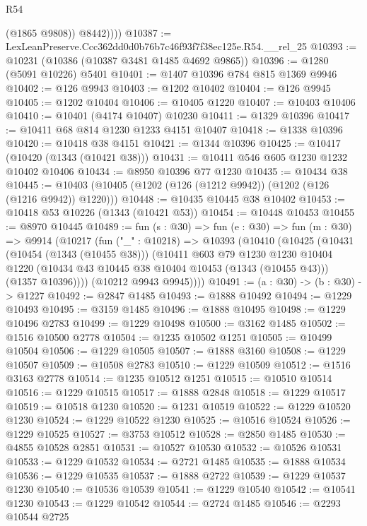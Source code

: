 \begin{lexlean}{R54}
\begin{coremodule}
              (@1865 @9808))
            @8442))))
@10387 := LexLeanPreserve.Ccc362dd0d0b76b7c46f93f7f38ec125e.R54.__rel_25
@10393 := @10231 (@10386 (@10387 @3481 @1485 @4692 @9865))
@10396 := @1280 (@5091 @10226) @5401
@10401 := @1407 @10396 @784 @815 @1369 @9946
@10402 := @126 @9943
@10403 := @1202 @10402
@10404 := @126 @9945
@10405 := @1202 @10404
@10406 := @10405 @1220
@10407 := @10403 @10406
@10410 := @10401 (@4174 @10407) @10230
@10411 := @1329 @10396
@10417 := @10411 @68 @814 @1230 @1233 @4151 @10407
@10418 := @1338 @10396
@10420 := @10418 @38 @4151
@10421 := @1344 @10396
@10425 := @10417 (@10420 (@1343 (@10421 @38)))
@10431 := @10411 @546 @605 @1230 @1232 @10402 @10406
@10434 := @8950 @10396 @77 @1230
@10435 := @10434 @38
@10445 := @10403 (@10405 (@1202 (@126 (@1212 @9942)) (@1202 (@126 (@1216 @9942)) @1220)))
@10448 := @10435 @10445 @38 @10402
@10453 := @10418 @53 @10226 (@1343 (@10421 @53))
@10454 := @10448 @10453
@10455 := @8970 @10445
@10489 := fun (s : @30) =>
  fun (e : @30) =>
  fun (m : @30) =>
  @9914
    (@10217
      (fun ("_" : @10218) =>
      @10393
        (@10410
          (@10425
            (@10431
              (@10454 (@1343 (@10455 @38)))
              (@10411
                @603
                @79
                @1230
                @1230
                @10404
                @1220
                (@10434 @43 @10445 @38 @10404 @10453 (@1343 (@10455 @43)))
                (@1357 @10396))))
          (@10212 @9943 @9945))))
@10491 := (a : @30) -> (b : @30) -> @1227
@10492 := @2847 @1485
@10493 := @1888 @10492
@10494 := @1229 @10493
@10495 := @3159 @1485
@10496 := @1888 @10495
@10498 := @1229 @10496 @2783
@10499 := @1229 @10498
@10500 := @3162 @1485
@10502 := @1516 @10500 @2778
@10504 := @1235 @10502 @1251
@10505 := @10499 @10504
@10506 := @1229 @10505
@10507 := @1888 @3160
@10508 := @1229 @10507
@10509 := @10508 @2783
@10510 := @1229 @10509
@10512 := @1516 @3163 @2778
@10514 := @1235 @10512 @1251
@10515 := @10510 @10514
@10516 := @1229 @10515
@10517 := @1888 @2848
@10518 := @1229 @10517
@10519 := @10518 @1230
@10520 := @1231 @10519
@10522 := @1229 @10520 @1230
@10524 := @1229 @10522 @1230
@10525 := @10516 @10524
@10526 := @1229 @10525
@10527 := @3753 @10512
@10528 := @2850 @1485
@10530 := @4855 @10528 @2851
@10531 := @10527 @10530
@10532 := @10526 @10531
@10533 := @1229 @10532
@10534 := @2721 @1485
@10535 := @1888 @10534
@10536 := @1229 @10535
@10537 := @1888 @2722
@10539 := @1229 @10537 @1230
@10540 := @10536 @10539
@10541 := @1229 @10540
@10542 := @10541 @1230
@10543 := @1229 @10542
@10544 := @2724 @1485
@10546 := @2293 @10544 @2725

\end{coremodule}
\end{lexlean}
